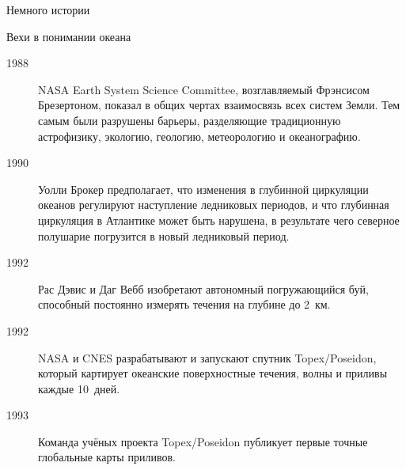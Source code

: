 \begin{chapter}{Немного истории}
\begin{section}{Вехи в понимании океана}
\begin{description}
\item[1988] NASA Earth System Science Committee, возглавляемый
Фрэнсисом Брезертоном, показал в общих чертах взаимосвязь всех систем Земли.
Тем самым были разрушены барьеры, разделяющие традиционную астрофизику, 
экологию, геологию, метеорологию и океанографию.
%

\item[1990] Уолли Брокер предполагает, что изменения в глубинной
циркуляции океанов регулируют наступление ледниковых периодов, и что
глубинная циркуляция в Атлантике может быть нарушена, в результате чего
северное полушарие погрузится в новый ледниковый период.
%

\item[1992] Рас Дэвис и Даг Вебб изобретают автономный погружающийся
буй, способный постоянно измерять течения на глубине до 2~км.
%

\item[1992] NASA и CNES разрабатывают и запускают спутник Topex/Poseidon,
который картирует океанские поверхностные течения, волны и приливы каждые 
10~дней.
%

\item[1993] Команда учёных проекта Topex/Poseidon публикует первые точные
глобальные карты приливов.
%
\end{description}


\end{section}
\end{chapter}
